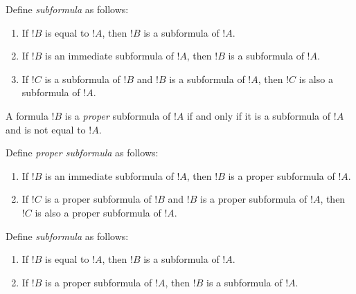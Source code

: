 \documentclass[syntax-and-semantics]{subfiles}
\begin{document}

\begin{defn}[Subformula]
Define \emph{subformula} as follows:
\begin{enumerate}
\item If $!B$ is equal to $!A$, then $!B$ is a subformula of $!A$.
\item If $!B$ is an immediate subformula of $!A$, then $!B$ is a subformula of $!A$.
\item If $!C$ is a subformula of $!B$ and $!B$ is a subformula of $!A$, then $!C$ is also a subformula of $!A$.
\end{enumerate}
A formula $!B$ is a \emph{proper} subformula of $!A$ if and only if it is a subformula of $!A$ and is not equal to $!A$.
\end{defn}


\begin{defn}
Define \emph{proper subformula} as follows:
\begin{enumerate}
\item If $!B$ is an immediate subformula of $!A$, then $!B$ is a proper subformula of $!A$.
\item If $!C$ is a proper subformula of $!B$ and $!B$ is a proper subformula of $!A$, then $!C$ is also a proper subformula of $!A$.
\end{enumerate}
\end{defn}

\begin{defn}[Subformula]
Define \emph{subformula} as follows:
\begin{enumerate}
\item If $!B$ is equal to $!A$, then $!B$ is a subformula of $!A$.
\item If $!B$ is a proper subformula of $!A$, then $!B$ is a subformula of $!A$.
\end{enumerate}
\end{defn}

\end{document}
